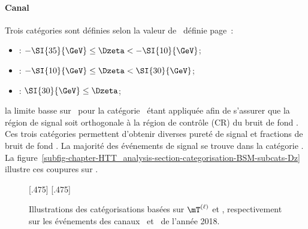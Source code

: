 \paragraph{Canal \ele\mu}
Trois catégories sont définies selon la valeur de \Dzeta\ définie page~\pageref{eq-Dzeta_def}:
\begin{itemize}
\item \CATlowdz: $-\SI{35}{\GeV} \leq \Dzeta < -\SI{10}{\GeV}$;
\item \CATmediumdz: $-\SI{10}{\GeV} \leq \Dzeta < \SI{30}{\GeV}$;
\item \CAThighdz: $\SI{30}{\GeV} \leq \Dzeta$;
\end{itemize}
la limite basse sur \Dzeta\ pour la catégorie \CATlowdz\ étant appliquée afin de s'assurer que la région de signal soit orthogonale à la région de contrôle (CR) du bruit de fond \ttbar.
Ces trois catégories permettent d'obtenir diverses pureté de signal et fractions de bruit de fond \ttbar.
La majorité des événements de signal se trouve dans la catégorie \CATmediumdz.
La figure~\ref{subfig-chapter-HTT_analysis-section-categorisation-BSM-subcats-Dz} illustre ces coupures sur \Dzeta.
\begin{figure}[h]
\centering

[.475\textwidth]
{}
\hfill
{}[.475\textwidth]
{}

\caption[Illustrations des catégorisations basées sur $\mT^{(\ell)}$ et \Dzeta]{Illustrations des catégorisations basées sur $\mT^{(\ell)}$ et \Dzeta, respectivement sur les événements des canaux \ele\tauh\ et \ele\mu\ de l'année 2018.}
\label{fig-chapter-HTT_analysis-section-categorisation-BSM-subcats}
\end{figure}
